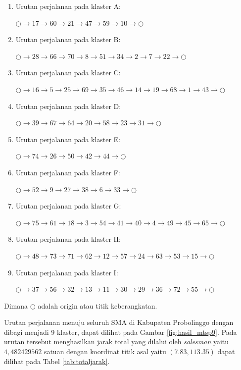 \begin{enumerate}
\item Urutan perjalanan pada klaster A:

$\bigcirc \to 17 \to 60 \to 21 \to 47 \to 59 \to 10 \to \bigcirc$

\item Urutan perjalanan pada klaster B:

$\bigcirc \to 28 \to 66 \to 70 \to 8 \to 51 \to 34 \to 2 \to 7 \to 22 \to \bigcirc$

\item Urutan perjalanan pada klaster C:

$\bigcirc \to 16 \to 5 \to 25 \to 69 \to 35 \to 46 \to 14 \to 19 \to 68 \to 1 \to 43 \to \bigcirc$

\item Urutan perjalanan pada klaster D:

$\bigcirc \to 39 \to 67 \to 64 \to 20 \to 58 \to 23 \to 31 \to \bigcirc$

\item Urutan perjalanan pada klaster E:

$\bigcirc \to 74 \to 26 \to 50 \to 42 \to 44 \to \bigcirc$

\item Urutan perjalanan pada klaster F:

$\bigcirc \to 52 \to 9 \to 27 \to 38 \to 6 \to 33 \to \bigcirc$

\item Urutan perjalanan pada klaster G:

$\bigcirc \to 75 \to 61 \to 18 \to 3 \to 54 \to 41 \to 40 \to 4 \to 49 \to 45 \to 65 \to \bigcirc$

\item Urutan perjalanan pada klaster H:

$\bigcirc \to 48 \to 73 \to 71 \to 62 \to 12 \to 57 \to 24 \to 63 \to 53 \to 15 \to \bigcirc$

\item Urutan perjalanan pada klaster I:

$\bigcirc \to 37 \to 56 \to 32 \to 13 \to 11 \to 30 \to 29 \to 36 \to 72 \to 55 \to \bigcirc$

\end{enumerate}

\noindent Dimana $\bigcirc$ adalah origin atau titik keberangkatan.

Urutan perjalanan menuju seluruh SMA di Kabupaten Probolinggo dengan dibagi menjadi 9 klaster, dapat dilihat pada Gambar \ref{fig:hasil_mtsp9}. Pada urutan tersebut menghasilkan jarak total yang dilalui oleh \textit{salesman} yaitu $4,482429562$ satuan dengan koordinat titik asal yaitu $(7.83, 113.35)$ dapat dilihat pada Tabel \ref{tab:totaljarak}.

